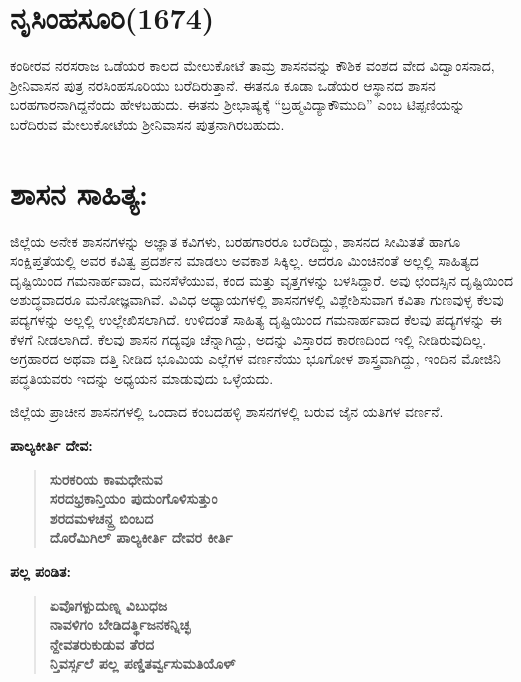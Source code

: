 \section*{ನೃಸಿಂಹಸೂರಿ(1674)}

ಕಂಠೀರವ ನರಸರಾಜ ಒಡೆಯರ ಕಾಲದ ಮೇಲುಕೋಟೆ ತಾಮ್ರ ಶಾಸನವನ್ನು ಕೌಶಿಕ ವಂಶದ ವೇದ ವಿದ್ವಾಂಸನಾದ, ಶ‍್ರೀನಿವಾಸನ ಪುತ್ರ ನರಸಿಂಹಸೂರಿಯು ಬರೆದಿರುತ್ತಾನೆ. ಈತನೂ ಕೂಡಾ ಒಡೆಯರ ಆಸ್ಥಾನದ ಶಾಸನ ಬರಹಗಾರನಾಗಿದ್ದ\-ನೆಂದು ಹೇಳಬಹುದು. ಈತನು ಶ‍್ರೀಭಾಷ್ಯಕ್ಕೆ “ಬ್ರಹ್ಮವಿದ್ಯಾಕೌಮುದಿ” ಎಂಬ ಟಿಪ್ಪಣಿಯನ್ನು ಬರೆದಿರುವ ಮೇಲುಕೋಟೆಯ ಶ‍್ರೀನಿವಾಸನ ಪುತ್ರನಾಗಿರಬಹುದು.

\section*{ಶಾಸನ ಸಾಹಿತ್ಯ:}

ಜಿಲ್ಲೆಯ ಅನೇಕ ಶಾಸನಗಳನ್ನು ಅಜ್ಞಾತ ಕವಿಗಳು, ಬರಹಗಾರರೂ ಬರೆದಿದ್ದು, ಶಾಸನದ ಸೀಮಿತತೆ ಹಾಗೂ ಸಂಕ್ಷಿಪ್ತತೆಯಲ್ಲಿ ಅವರ ಕವಿತ್ವ ಪ್ರದರ್ಶನ ಮಾಡಲು ಅವಕಾಶ ಸಿಕ್ಕಿಲ್ಲ. ಆದರೂ ಮಿಂಚಿನಂತೆ ಅಲ್ಲಲ್ಲಿ ಸಾಹಿತ್ಯದ ದೃಷ್ಟಿಯಿಂದ ಗಮನಾರ್ಹವಾದ, ಮನಸೆಳೆಯುವ, ಕಂದ ಮತ್ತು ವೃತ್ತಗಳನ್ನು ಬಳಸಿದ್ದಾರೆ. ಅವು ಛಂದಸ್ಸಿನ ದೃಷ್ಟಿಯಿಂದ ಅಶುದ್ಧವಾದರೂ ಮನೋಜ್ಞವಾಗಿವೆ. ವಿವಿಧ ಅಧ್ಯಾಯಗಳಲ್ಲಿ ಶಾಸನಗಳಲ್ಲಿ ವಿಶ್ಲೇಶಿಸುವಾಗ ಕವಿತಾ ಗುಣವುಳ್ಳ ಕೆಲವು ಪದ್ಯಗಳನ್ನು ಅಲ್ಲಲ್ಲಿ ಉಲ್ಲೇಖಿಸಲಾಗಿದೆ. ಉಳಿದಂತೆ ಸಾಹಿತ್ಯ ದೃಷ್ಟಿಯಿಂದ ಗಮನಾರ್ಹವಾದ ಕೆಲವು ಪದ್ಯಗಳನ್ನು ಈ ಕೆಳಗೆ ನೀಡಲಾಗಿದೆ. ಕೆಲವು ಶಾಸನ ಗದ್ಯವೂ ಚೆನ್ನಾಗಿದ್ದು, ಅದನ್ನು ವಿಸ್ತಾರದ ಕಾರಣದಿಂದ ಇಲ್ಲಿ ನೀಡಿರುವುದಿಲ್ಲ. ಅಗ್ರಹಾರದ ಅಥವಾ ದತ್ತಿ ನೀಡಿದ ಭೂಮಿಯ ಎಲ್ಲೆಗಳ ವರ್ಣನೆಯು ಭೂಗೋಳ ಶಾಸ್ತ್ರವಾಗಿದ್ದು, ಇಂದಿನ ಮೋಜಿನಿ ಪದ್ಧತಿಯವರು ಇದನ್ನು ಅಧ್ಯಯನ ಮಾಡುವುದು ಒಳ್ಳೆಯದು.

ಜಿಲ್ಲೆಯ ಪ್ರಾಚೀನ ಶಾಸನಗಳಲ್ಲಿ ಒಂದಾದ ಕಂಬದಹಳ್ಳಿ ಶಾಸನಗಳಲ್ಲಿ ಬರುವ ಜೈನ ಯತಿಗಳ ವರ್ಣನೆ.

\noindent
\textbf{ಪಾಲ್ಯಕೀರ್ತಿ ದೇವ:}

\begin{verse}
\textbf{ಸುರಕರಿಯ ಕಾಮಧೇನುವ \\ ಸರದಭ್ರಕಾನ್ತಿಯಂ ಪುದುಂಗೊಳಿಸುತ್ತುಂ \\ ಶರದಮಳಚನ್ದ್ರ ಬಿಂಬದ \\ ದೊರೆಮಿಗಿಲ್​ ಪಾಲ್ಯಕೀರ್ತಿ ದೇವರ ಕೀರ್ತಿ}
\end{verse}

\noindent
\textbf{ಪಲ್ಲ ಪಂಡಿತ:}

\begin{verse}
\textbf{ಏವೊಗಳ್ಪುದುಣ್ನ ವಿಬುಧಜ \\ ನಾವಳಿಗಂ ಬೇಡಿದರ್ತ್ಥಿಜನಕನ್ನಿಚ್ಛ \\ ನ್ದೇವತರುಕುಡುವ ತೆರದ \\ ನ್ತಿವರ್ಸ್ಸಲೆ ಪಲ್ಲ ಪಣ್ಡಿತರ್ವ್ವಸುಮತಿಯೊಳ್​}
\end{verse}

